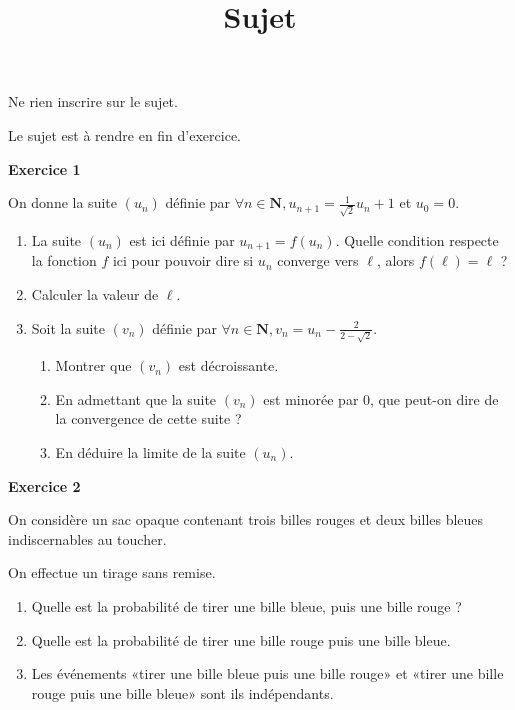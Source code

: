 \documentclass[12pt,a4paper,french]{article}
\author{}
\title{Sujet \no{1}}
\date{}
\begin{document}
\maketitle
\begin{center}Ne rien inscrire sur le sujet.

  Le sujet est à rendre en fin d'exercice.
\end{center}

\bigskip

\textbf{Exercice 1}

On donne la suite $(u_n)$ définie par $\forall n\in \mathbf{N},
u_{n+1} = \frac{1}{\sqrt{2}}u_{n} + 1$ et $u_0 = 0$.
\begin{enumerate}
  \item La suite $(u_n)$ est ici définie par $u_{n+1} = f(u_n)$. Quelle
    condition respecte la fonction $f$ ici pour pouvoir dire si $u_n$
    converge vers $\ell$, alors $f(\ell) = \ell$ ?
  \item Calculer la valeur de $\ell$.
  \item Soit la suite $(v_n)$ définie par $\forall n\in \mathbf{N}, v_n
    = u_n - \frac{2}{2 - \sqrt{2}}$.
    \begin{enumerate}
      \item Montrer que $(v_n)$ est décroissante.
      \item En admettant que la suite $(v_n)$ est minorée par 0, que
        peut-on dire de la convergence de cette suite ?
      \item En déduire la limite de la suite $(u_n)$.
    \end{enumerate}
\end{enumerate}

\medskip

\textbf{Exercice 2}

On considère un sac opaque contenant trois billes rouges et deux billes
bleues indiscernables au toucher.

On effectue un tirage sans remise.

\begin{enumerate}
  \item Quelle est la probabilité de tirer une bille bleue, puis une
    bille rouge ?
  \item Quelle est la probabilité de tirer une bille rouge puis une
    bille bleue.
  \item Les événements «tirer une bille bleue puis une bille rouge» et
    «tirer une bille rouge puis une bille bleue» sont ils indépendants.
\end{enumerate}
\end{document}
